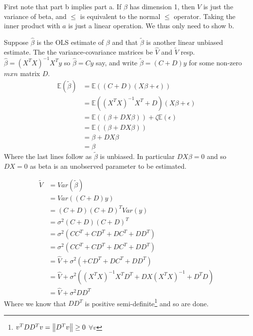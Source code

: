 First note that part b implies part a. If $\beta$ has dimension 1, then $V$ is just the variance of beta, and $\leq$ is equivalent to the normal $\leq$ operator. Taking the inner product with $a$ is just a linear operation. We thus only need to show b.


Suppose $\hat{\beta}$ is the OLS estimate of $\beta$ and that $\tilde{\beta}$ is another linear unbiased estimate. The the variance-covariance matrices be $\hat{V}$ and $\tilde{V}$ resp.
$\hat{\beta} = \left(X^T X\right)^{-1} X^T y$ so $\hat{\beta} = C y$ say, and write $\tilde{\beta} = (C + D) y $ for some non-zero $m x n$ matrix $D$.
\begin{align*}
    \mathbb{E}\left(\tilde{\beta}\right) &= \mathbb{E}\left(\left(C + D\right) \left(X\beta + \epsilon\right) \right) \\
    &= \mathbb{E} \left(\left(X^T X\right)^{-1} X^T + D\right) \left(X\beta + \epsilon\right)  \\
    &= \mathbb{E}\left(\left(\beta + DX\beta \right) \right) + \zeta \mathbb{E}(\epsilon) \\
    &= \mathbb{E}\left(\left(\beta + DX\beta \right) \right) \\
    &= \beta + DX\beta \\
    &= \beta
\end{align*}
Where the last lines follow as $\tilde{\beta}$ is unbiased. In particular $DX\beta = 0$ and so $DX = 0$ as beta is an unobserved parameter to be estimated.

\begin{align*}
    \tilde{V} &= Var\left(\tilde{\beta}\right)\\
    &= Var\left(\left(C + D\right) y \right) \\
    &= \left(C + D\right) \left(C + D\right)^T Var\left( y \right) \\
    &= \sigma^2 \left(C + D\right) \left(C + D\right)^T\\
    &= \sigma^2 \left( C C^T + C D^T  + D C^T + D D^T\right)\\
    &= \sigma^2 \left(C C^T  + C D^T  + D C^T + D D^T\right)\\
    &= \hat{V} + \sigma^2 \left(+ C D^T  + D C^T + D D^T\right) \\
    &= \hat{V} + \sigma^2 \left(\left(X^T X\right)^{-1}X^T D^T  +   D X \left(X^T X\right)^{-1} + D^T D\right) \\
    &= \hat{V} + \sigma^2 D D^T
\end{align*}
Where we know that $D D^T$ is positive semi-definite\footnote{$v^T D D^T v = \left\lVert D^T v\right\rVert \geq 0$ $ \forall v $} and so are done.


